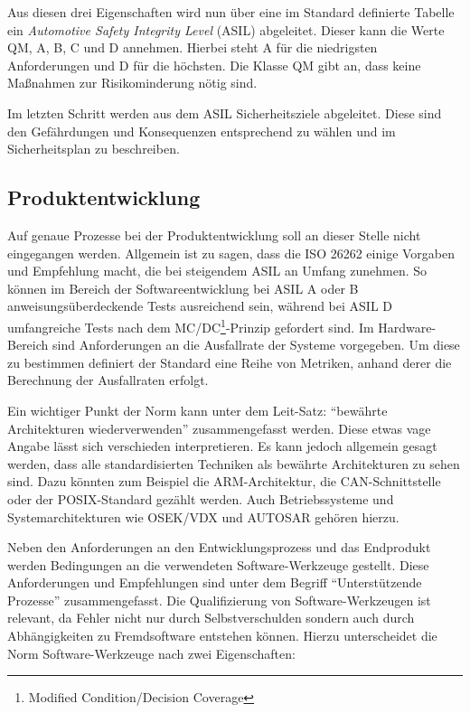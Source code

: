 \documentclass[
  a4paper,					    %
  twoside,
  DIV=calc,     				%
  bibliography=totoc,
  cleardoublepage=empty,
  ngerman,     					%
  final       					%
]{scrbook}
\begin{document}
Aus diesen drei Eigenschaften wird nun über eine im Standard definierte Tabelle ein \emph{Automotive Safety Integrity Level} (ASIL) abgeleitet. Dieser kann die Werte QM, A, B, C und D annehmen. Hierbei steht A für die niedrigsten Anforderungen und D für die höchsten. Die Klasse QM gibt an, dass keine Maßnahmen zur Risikominderung nötig sind.

Im letzten Schritt werden aus dem ASIL Sicherheitsziele abgeleitet. Diese sind den Gefährdungen und Konsequenzen entsprechend zu wählen und im Sicherheitsplan zu beschreiben.


\subsection{Produktentwicklung}
\label{sec:ISO26262_produkt_entwicklung}
Auf genaue Prozesse bei der Produktentwicklung soll an dieser Stelle nicht eingegangen werden. Allgemein ist zu sagen, dass die ISO 26262 einige Vorgaben und Empfehlung macht, die bei steigendem ASIL an Umfang zunehmen. So können im Bereich der Softwareentwicklung bei ASIL A oder B anweisungsüberdeckende Tests ausreichend sein, während bei ASIL D umfangreiche Tests nach dem MC/DC\footnote{Modified Condition/Decision Coverage}-Prinzip gefordert sind. Im Hardware-Bereich sind Anforderungen an die Ausfallrate der Systeme vorgegeben. Um diese zu bestimmen definiert der Standard eine Reihe von Metriken, anhand derer die Berechnung der Ausfallraten erfolgt.

Ein wichtiger Punkt der Norm kann unter dem Leit-Satz: "`bewährte Architekturen wiederverwenden"' zusammengefasst werden. Diese etwas vage Angabe lässt sich verschieden interpretieren. Es kann jedoch allgemein gesagt werden, dass alle standardisierten Techniken als bewährte Architekturen zu sehen sind. Dazu könnten zum Beispiel die ARM-Architektur, die CAN-Schnittstelle oder der POSIX-Standard gezählt werden. Auch Betriebssysteme und Systemarchitekturen wie OSEK/VDX und AUTOSAR gehören hierzu.

Neben den Anforderungen an den Entwicklungsprozess und das Endprodukt werden Bedingungen an die verwendeten Software-Werkzeuge gestellt. Diese Anforderungen und Empfehlungen sind unter dem Begriff "`Unterstützende Prozesse"' zusammengefasst. Die Qualifizierung von Software-Werkzeugen ist relevant, da Fehler nicht nur durch Selbstverschulden sondern auch durch Abhängigkeiten zu Fremdsoftware entstehen können. Hierzu unterscheidet die Norm Software-Werkzeuge nach zwei Eigenschaften:
\end{document}
